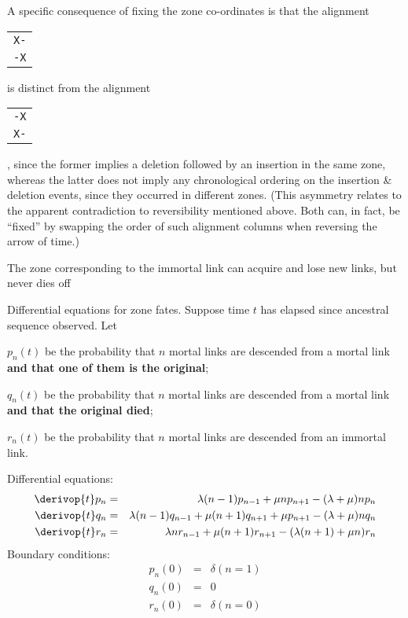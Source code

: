 \documentclass{beamer}
\begin{document}
\begin{frame}{}
\itemb
  \item A specific consequence of fixing the zone co-ordinates is that the alignment
\begin{tabular}{l} {\tt X-} \\ {\tt -X} \end{tabular}
is distinct from the alignment
\begin{tabular}{l} {\tt -X} \\ {\tt X-} \end{tabular},
since the former implies a deletion followed by an insertion in the same zone,
whereas the latter does not imply any chronological ordering on the insertion \& deletion events, since they occurred in different zones.
(This asymmetry relates to the apparent contradiction to reversibility mentioned above. Both can, in fact, be ``fixed'' by swapping the order of such alignment columns when reversing the arrow of time.)
 \item The zone corresponding to the immortal link can acquire and lose new links, but never dies off
\iteme
\end{frame}

\begin{frame}{}
\itemb
 \item Differential equations for zone fates. Suppose time $t$ has elapsed since ancestral sequence observed. Let
  \itemb
  \item $p_n(t)$ be the probability that $n$ mortal links are descended from a mortal link {\bf and that one of them is the original};
  \item $q_n(t)$ be the probability that $n$ mortal links are descended from a mortal link {\bf and that the original died};
  \item $r_n(t)$ be the probability that $n$ mortal links are descended from an immortal link.
  \iteme
\iteme
\end{frame}

\begin{frame}{}
Differential equations:
\begin{eqnarray*}
\derivop{t} p_n & = & \lambda (n-1) p_{n-1} + \mu n p_{n+1} - (\lambda + \mu) n p_n \\
\derivop{t} q_n & = & \lambda (n-1) q_{n-1} + \mu (n+1) q_{n+1} + \mu p_{n+1} - (\lambda + \mu) n q_n \\
\derivop{t} r_n & = & \lambda n r_{n-1} + \mu (n+1) r_{n+1} - (\lambda (n+1) + \mu n) r_n
\end{eqnarray*}
Boundary conditions:
\begin{eqnarray*}
p_n(0) & = & \delta (n = 1) \\
q_n(0) & = & 0 \\
r_n(0) & = & \delta (n = 0)
\end{eqnarray*}
\end{frame}
\end{document}

